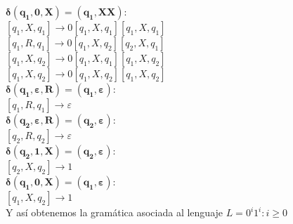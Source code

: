 \documentclass[10pt,a4paper,spanish]{report}
\begin{document}
\noindent
$\mathbf{\delta(q_1, 0, X) = (q_1, XX)}$: \\
$[q_1, X, q_1] \rightarrow 0[q_1, X, q_1][q_1, X, q_1] $ \\
$[q_1, R, q_1] \rightarrow 0[q_1, X, q_2][q_2, X, q_1] $ \\
$[q_1, X, q_2] \rightarrow 0[q_1, X, q_1][q_1, X, q_2] $ \\
$[q_1, X, q_2] \rightarrow 0[q_1, X, q_2][q_1, X, q_2] $ \\

\noindent
$\mathbf{\delta(q_1, \varepsilon, R) = (q_1, \varepsilon)}$: \\
$[q_1, R, q_1] \rightarrow \varepsilon $ \\

\noindent
$\mathbf{\delta(q_2, \varepsilon, R) = (q_2, \varepsilon)}$: \\
$[q_2, R, q_2] \rightarrow \varepsilon $ \\

\noindent
$\mathbf{\delta(q_2, 1, X) = (q_2, \varepsilon)}$: \\
$[q_2, X, q_2] \rightarrow 1 $ \\

\noindent
$\mathbf{\delta(q_1, 0, X) = (q_1, \varepsilon)}$: \\
$[q_1, X, q_2] \rightarrow 1 $ \\

\noindent
Y así obtenemos la gramática asociada al lenguaje $L = 0^i1^i : i \geq 0$
\end{document}
